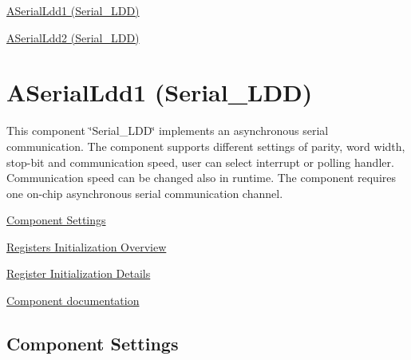 
\begin{DoxyItemize}
\item \hyperlink{ASerialLdd1}{A\+Serial\+Ldd1 (Serial\+\_\+\+L\+DD)}
\item \hyperlink{ASerialLdd2}{A\+Serial\+Ldd2 (Serial\+\_\+\+L\+DD)} 
\end{DoxyItemize}\hypertarget{ASerialLdd1}{}\section{A\+Serial\+Ldd1 (Serial\+\_\+\+L\+DD)}\label{ASerialLdd1}
This component \char`\"{}\+Serial\+\_\+\+L\+D\+D\char`\"{} implements an asynchronous serial communication. The component supports different settings of parity, word width, stop-\/bit and communication speed, user can select interrupt or polling handler. Communication speed can be changed also in runtime. The component requires one on-\/chip asynchronous serial communication channel.


\begin{DoxyItemize}
\item \hyperlink{ASerialLdd1_settings}{Component Settings}
\item \hyperlink{ASerialLdd1_regs_overview}{Registers Initialization Overview}
\item \hyperlink{ASerialLdd1_regs_details}{Register Initialization Details}
\item \hyperlink{group___a_serial_ldd1__module}{Component documentation} 
\end{DoxyItemize}\hypertarget{ASerialLdd1_settings}{}\subsection{Component Settings}\label{ASerialLdd1_settings}


